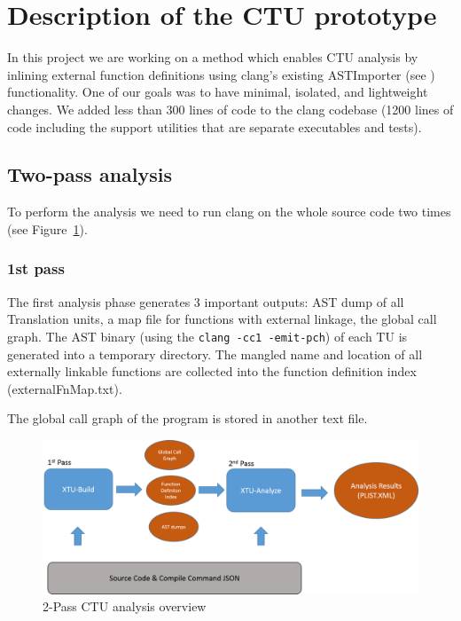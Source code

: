 \documentclass{article}
\begin{document}

\section{Description of the CTU prototype}
In this project we are working on a method which enables CTU analysis 
by inlining external function definitions using clang's existing ASTImporter 
(see \cite{astimporter}) functionality.
One of our goals was to have minimal, isolated, and lightweight changes.
We added less than 300 lines of code to the clang codebase 
(1200 lines of code including the support utilities that are 
  separate executables and tests). 

\subsection{Two-pass analysis}
To perform the analysis we need to run clang on the whole source code two times 
(see Figure~\ref{figctu}).

\subsubsection*{1st pass}
The first analysis phase generates 3 important outputs: AST dump of all
Translation units, a map file for functions with external linkage, the global call graph.
The AST binary (using the {\tt clang -cc1 -emit-pch}) 
of each TU is generated into a temporary directory. 
The mangled name and location of all externally linkable functions 
are collected into the function definition index (externalFnMap.txt). 

The global call graph of the program is stored in another text file.

\begin{figure}[h!]
\includegraphics[width=\textwidth]{images/ctu.png}
\caption{2-Pass CTU analysis overview}
\label{figctu}
\end{figure}
\end{document}
